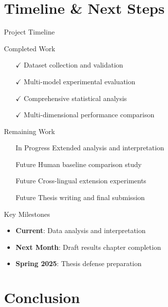 \documentclass[aspectratio=169]{beamer}
\begin{document}
\section{Timeline \& Next Steps}

\begin{frame}{Project Timeline}
\begin{block}{Completed Work}
\begin{itemize}
    \item[$\checkmark$] Dataset collection and validation
    \item[$\checkmark$] Multi-model experimental evaluation
    \item[$\checkmark$] Comprehensive statistical analysis
    \item[$\checkmark$] Multi-dimensional performance comparison
\end{itemize}
\end{block}

\begin{block}{Remaining Work}
\begin{itemize}
    \item[In Progress] Extended analysis and interpretation
    \item[Future] Human baseline comparison study
    \item[Future] Cross-lingual extension experiments
    \item[Future] Thesis writing and final submission
\end{itemize}
\end{block}

\begin{block}{Key Milestones}
\begin{itemize}
    \item \textbf{Current}: Data analysis and interpretation
    \item \textbf{Next Month}: Draft results chapter completion
    \item \textbf{Spring 2025}: Thesis defense preparation
\end{itemize}
\end{block}
\end{frame}

\section{Conclusion}
\end{document}

